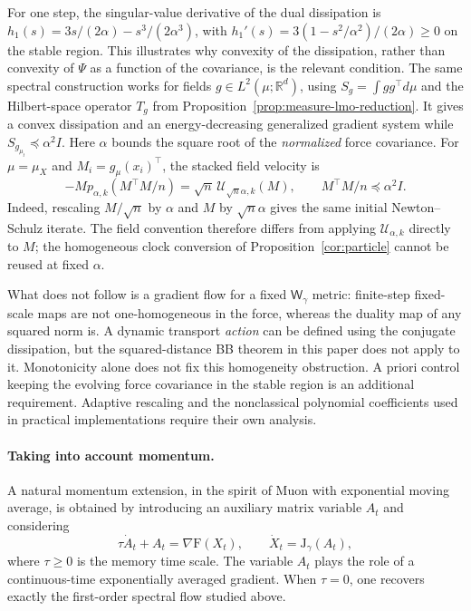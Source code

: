 \documentclass{article}
\newcommand{\R}{\mathbb{R}}
\newcommand{\mF}{\mathrm{F}}
\newcommand{\mJ}{\mathrm{J}}
\newcommand{\Wg}{\mathsf{W}_{\gamma}}
\begin{document}
For one step, the singular-value derivative of the dual dissipation is
$h_1(s)=3s/(2\alpha)-s^3/(2\alpha^3)$, with
$h_1'(s)=3(1-s^2/\alpha^2)/(2\alpha)\ge0$ on the stable region.
This illustrates why convexity of the dissipation, rather than convexity of
$\Psi$ as a function of the covariance, is the relevant condition.
The same spectral construction works for fields $g\in L^2(\mu;\R^d)$,
using $S_g=\int gg^\top d\mu$ and the Hilbert-space operator $T_g$ from
Proposition~\ref{prop:measure-lmo-reduction}.
It gives a convex dissipation and an energy-decreasing generalized gradient
system while $S_{g_{\mu_t}}\preceq\alpha^2I$.
Here $\alpha$ bounds the square root of the \emph{normalized} force covariance.
For $\mu=\mu_X$ and $M_i=g_\mu(x_i)^\top$, the stacked field velocity is
\begin{equation}\label{eq:ns-empirical-scaling}
 -M p_{\alpha,k}(M^\top M/n)
 =\sqrt n\,\mathcal U_{\sqrt n\alpha,k}(M),
 \qquad M^\top M/n\preceq\alpha^2I.
\end{equation}
Indeed, rescaling $M/\sqrt n$ by $\alpha$ and $M$ by $\sqrt n\alpha$
gives the same initial Newton--Schulz iterate. The field convention
therefore differs from applying $\mathcal U_{\alpha,k}$ directly to $M$;
the homogeneous clock conversion of Proposition~\ref{cor:particle}
cannot be reused at fixed $\alpha$.

What does not follow is a gradient flow for a fixed $\Wg$ metric:
finite-step fixed-scale maps are not one-homogeneous in the force, whereas
the duality map of any squared norm is. A dynamic transport \emph{action}
can be defined using the conjugate dissipation, but the squared-distance BB
theorem in this paper does not apply to it. Monotonicity alone does not fix
this homogeneity obstruction. A priori control keeping the evolving force
covariance in the stable region is an additional requirement. Adaptive
rescaling and the nonclassical polynomial coefficients used in practical
implementations require their own analysis.

\paragraph{Taking into account momentum.}
A natural momentum extension, in the spirit of Muon with exponential moving average, is obtained by introducing an auxiliary matrix variable $A_t$ and considering
\begin{equation}
\label{eq:matrix-momentum}
\tau \dot A_t + A_t = \nabla \mF(X_t),
\qquad
\dot X_t = \mJ_\gamma(A_t),
\end{equation}
where $\tau\ge 0$ is the memory time scale. The variable $A_t$ plays the role of a continuous-time exponentially averaged gradient. When $\tau=0$, one recovers exactly the first-order spectral flow studied above.
\end{document}
